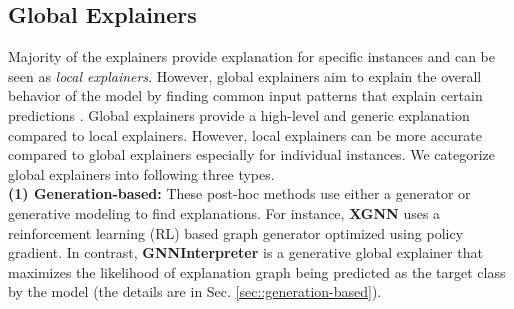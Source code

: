 \subsection{Global Explainers}
\label{sec::global}
Majority of the explainers provide explanation for specific instances and can be seen as \textit{local explainers}. However, global explainers aim to explain the overall behavior of the model by finding common input patterns that explain certain predictions \cite{xgnn}. Global explainers provide a high-level and generic explanation compared to local explainers. However, local explainers can be more accurate compared to global explainers \cite{xgnn} especially for individual instances. We categorize global explainers into following three types.\\
\noindent
\textbf{(1) Generation-based:} These post-hoc methods use either a generator or generative modeling to find explanations. For instance, \textbf{XGNN} \cite{xgnn} uses a reinforcement learning (RL) based graph generator optimized using policy gradient. In contrast, \textbf{GNNInterpreter} \cite{gnninterpreter} is a generative global explainer that maximizes the likelihood of explanation graph being predicted as the target class by the model (the details are in Sec. \ref{sec::generation-based}).\\

